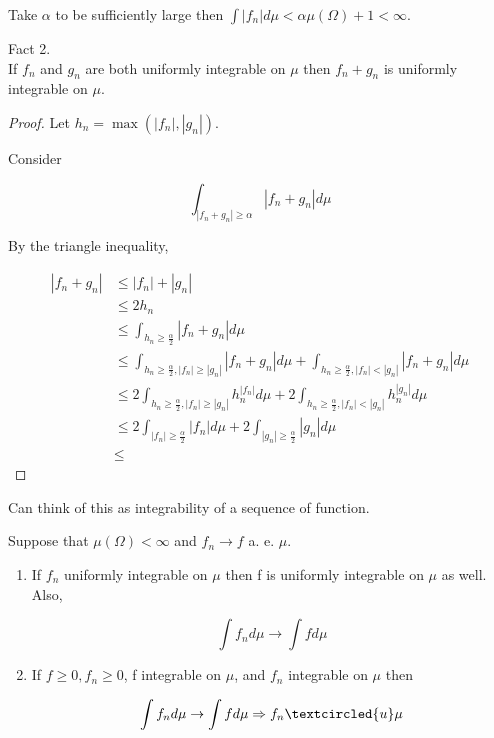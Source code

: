 \documentclass[11pt,fleqn]{book} %
\begin{document}
Take $\alpha$ to be sufficiently large then $\int |f_n| d\mu < \alpha \mu(\Omega) + 1 < \infty$. 



Fact 2. \\

If $f_n$ and $g_n$ are both uniformly integrable on $\mu$ then $f_n + g_n$ is uniformly integrable on $\mu$. 

		\begin{proof}
			Let $h_n = \max(|f_n|, |g_n|)$. 

			Consider 

					$$\int_{|f_n + g_n| \geq \alpha} |f_n + g_n| d\mu $$

			By the triangle inequality, 

				\begin{align*}
					|f_n + g_n| &\leq |f_n| + |g_n| \\
						&\leq 2 h_n \\
						&\leq \int_{h_n \geq \frac{\alpha}{2}} |f_n + g_n| d\mu \\
						&\leq \int_{h_n \geq \frac{\alpha}{2}, |f_n| \geq |g_n|} |f_n + g_n| d\mu + \int_{h_n \geq \frac{\alpha}{2}, |f_n| < |g_n|} |f_n + g_n| d\mu\\
						&\leq 2 \int_{h_n \geq \frac{\alpha}{2}, |f_n| \geq |g_n|} h_n ^{|f_n|} d\mu + 2 \int_{h_n \geq \frac{\alpha}{2}, |f_n| < |g_n|} h_n ^{|g_n|} d\mu\\
						&\leq 2 \int_{|f_n| \geq \frac{\alpha}{2}} |f_n| d\mu + 2 \int_{|g_n| \geq \frac{\alpha}{2}} |g_n| d\mu\\
						&\leq
				\end{align*}
		\end{proof}

Can think of this as integrability of a sequence of function. \\

\begin{theorem}[16.14]
	Suppose that $\mu(\Omega)< \infty$ and $f_n \rightarrow f$
 a. e. $\mu$. 

 		\begin{enumerate}
 			\item If $f_n$ uniformly integrable on $\mu$ then f is uniformly integrable on $\mu$ as well. Also, 

 					$$\int f_n d\mu \rightarrow \int f d\mu $$ 

 			\item If $f \geq 0, f_n \geq 0$, f integrable on $\mu$, and $f_n$ integrable on $\mu$ then 

 					$$\int f_n d\mu \rightarrow \int f d\mu \Rightarrow f_n \textcircled{u} \mu $$

 		\end{enumerate}
 \end{theorem}
\end{document}
